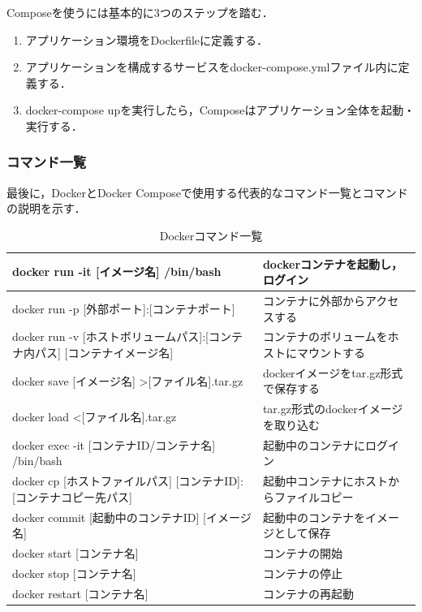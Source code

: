 Composeを使うには基本的に3つのステップを踏む．

\begin{enumerate}
    \item アプリケーション環境をDockerfileに定義する．
    \item アプリケーションを構成するサービスをdocker-compose.ymlファイル内に定義する．
    \item docker-compose upを実行したら，Composeはアプリケーション全体を起動・実行する．
\end{enumerate}

\newpage
\subsubsection{コマンド一覧}
最後に，DockerとDocker Composeで使用する代表的なコマンド一覧とコマンドの説明を示す．


\begin{table}[htb]
    \begin{center}
        \caption{Dockerコマンド一覧}
        \begin{tabularx}{\textwidth}{|l|X|}\hline
            docker run -it [イメージ名] /bin/bash & dockerコンテナを起動し，ログイン \\ \hline
            docker run -p [外部ポート]:[コンテナポート] & コンテナに外部からアクセスする \\ \hline
            docker run -v [ホストボリュームパス]:[コンテナ内パス] [コンテナイメージ名] & コンテナのボリュームをホストにマウントする \\ \hline
            docker save [イメージ名] \textgreater [ファイル名].tar.gz & dockerイメージをtar.gz形式で保存する\\ \hline
            docker load \textless [ファイル名].tar.gz & tar.gz形式のdockerイメージを取り込む \\ \hline
            docker exec -it [コンテナID/コンテナ名] /bin/bash & 起動中のコンテナにログイン \\ \hline
            docker cp [ホストファイルパス] [コンテナID]:[コンテナコピー先パス] & 起動中コンテナにホストからファイルコピー \\ \hline
            docker commit [起動中のコンテナID] [イメージ名] & 起動中のコンテナをイメージとして保存 \\ \hline
            docker start [コンテナ名] & コンテナの開始 \\ \hline
            docker stop [コンテナ名] & コンテナの停止 \\ \hline
            docker restart [コンテナ名] & コンテナの再起動 \\ \hline
        \end{tabularx}
        \label{docker_command}
    \end{center}
\end{table}


